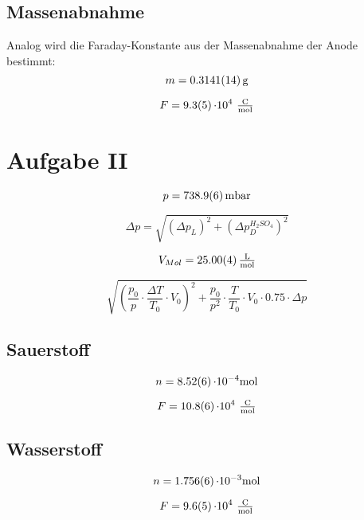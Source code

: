 \subsection{Massenabnahme}
Analog wird die Faraday-Konstante aus der Massenabnahme der Anode bestimmt:
\[ m = \SI{0,3141 \pm 0,0014}{\gram}\]

\[F = \SI{9,3\pm 0,5}{\cdot 10^{4}\ \tfrac{\coulomb}{\mole}}\]



\section{Aufgabe II}

\[ p = \SI{738.9 \pm 0.6}{\milli \text{bar} }\]

\begin{equation}
    \Delta p = \sqrt{(\Delta p_L)^2 + (\Delta p_D^{H_2SO_4})^2}
\end{equation}

\[V_{Mol} = \SI{25,00 \pm 0.04}{\tfrac{\litre}{\mole}}\]

\begin{equation}
    \sqrt{\left(\frac{p_0}{p} \cdot \frac{\Delta T}{T_0} \cdot V_0\right)^2 + \frac{p_0}{p^2} \cdot \frac{T}{T_0} \cdot V_0 \cdot 0.75 \cdot \Delta p}
\end{equation}

\subsection{Sauerstoff}

\[n = \SI{8,52 \pm 0,06}{\cdot 10 ^{-4}\mole}\]

\[F = \SI{10,8\pm 0,6}{\cdot 10^{4}\ \tfrac{\coulomb}{\mole}}\]


\subsection{Wasserstoff}

\[n = \SI{1,756 \pm 0,006}{\cdot 10 ^{-3}\mole}\]

\[F = \SI{9,6\pm 0,5}{\cdot 10^{4}\ \tfrac{\coulomb}{\mole}}\]

